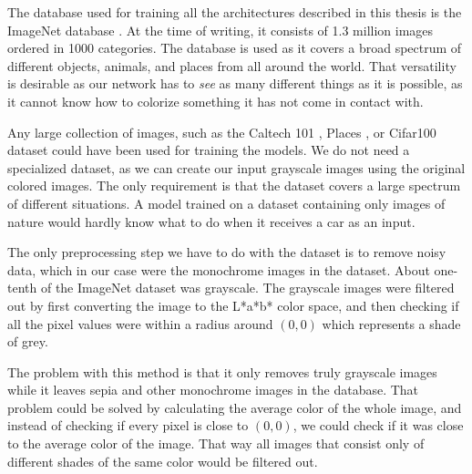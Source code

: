 The database used for training all the architectures described in this thesis is 
the ImageNet database \citep{deng2009imagenet}. At the time of writing, it 
consists of 1.3 million images ordered in 1000 categories. The database is used 
as it covers a broad spectrum of different objects, animals, and places from all 
around the world. That versatility is desirable as our network has to \textit{see}
as many different things as it is possible, as it cannot know how to colorize something 
it has not come in contact with.

Any large collection of images, such as the Caltech 101 \citep{fei2004caltech}, 
Places \citep{zhou2017places}, or Cifar100\citep{krizhevskycifar} dataset 
could have been used for training the models. We do not need a specialized dataset, 
as we can create our input grayscale images using the original colored images.
The only requirement is that the dataset covers a large spectrum of different
situations. A model trained on a dataset containing only images of nature 
would hardly know what to do when it receives a car as an input.

The only preprocessing step we have to do with the dataset is to remove noisy data, 
which in our case were the monochrome images in the dataset. About one-tenth of 
the ImageNet dataset was grayscale. The grayscale images were filtered out by 
first converting the image to the L*a*b* color space, and then checking if all 
the pixel values were within a radius around $(0, 0)$ which represents a shade of grey. 

The problem with this method is that it only removes truly grayscale images while
it leaves sepia and other monochrome images in the database. That problem could 
be solved by calculating the average color of the whole image, and instead of
checking if every pixel is close to $(0, 0)$, we could check if it was close
to the average color of the image. That way all images that consist only of 
different shades of the same color would be filtered out.
